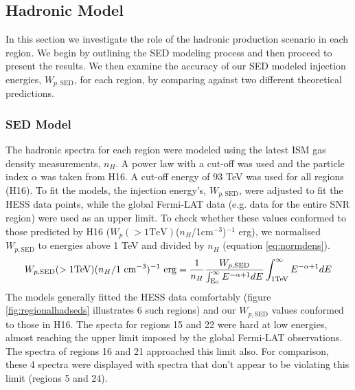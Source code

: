 \documentclass[12pt,a4paper]{article}
\begin{document}
\subsection{Hadronic Model} 
In this section we investigate the role of the hadronic production scenario in each region. We begin by outlining the SED modeling process and then proceed to present the results. We then examine the accuracy of our SED modeled injection energies, $W_{p,\mathrm{SED}}$, for each region, by comparing against two different theoretical predictions. 

\subsubsection{SED Model}
The hadronic spectra for each region were modeled using the latest ISM gas density measurements, $n_H$. A power law with a cut-off was used and the particle index $\alpha$ was taken from H16. A cut-off energy of $93$ TeV was used for all regions (H16). To fit the models, the injection energy's, $W_{p,\mathrm{SED}}$, were adjusted to fit the HESS data points, while the global Fermi-LAT data (e.g. data for the entire SNR region) were used as an upper limit. To check whether these values conformed to those predicted by H16 ($W_p\mathrm{(>1TeV)}$($n_H$/1cm$^{-3}$)$^{-1}$ erg), we normalised $W_{p,\mathrm{SED}}$ to energies above 1 TeV and divided by $n_H$ (equation \ref{eq:normdens}).
\begin{equation}\label{eq:normdens}
W_{p,\mathrm{SED}}\mathrm{(>1TeV)} (n_H/1 \ \mathrm{cm}^{-3})^{-1} \ \mathrm{erg} = \dfrac{1}{n_H}\dfrac{W_{p,\mathrm{SED}}}{\int_{\mathrm{E_0}}^{\infty}  E^{-\alpha + 1} dE}\int_{1 \mathrm{TeV}}^{\infty}  E^{-\alpha + 1} dE\\
\end{equation}
The models generally fitted the HESS data comfortably (figure \ref{fig:regionalhadseds} illustrates 6 such regions) and our $W_{p,\mathrm{SED}}$ values conformed to those in H16. The specta for regions 15 and 22 were hard at low energies, almost reaching the upper limit imposed by the global Fermi-LAT observations. The spectra of regions 16 and 21 approached this limit also. For comparison, these 4 spectra were displayed with spectra that don't appear to be violating this limit (regions 5 and 24). 
\end{document}
